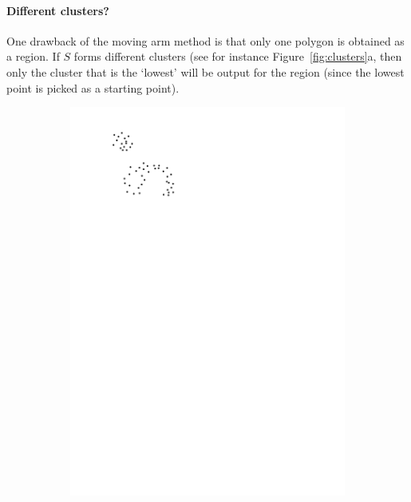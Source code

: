 \paragraph{Different clusters?} 
One drawback of the moving arm method is that only one polygon is obtained as a region.
If $S$ forms different clusters (see for instance Figure~\ref{fig:clusters}a, then only the cluster that is the `lowest' will be output for the region (since the lowest point is picked as a starting point).
\begin{figure}
  \centering
  \begin{subfigure}[b]{0.35\linewidth}
    \centering
    \includegraphics[page=1,width=\textwidth]{figs/clusters.pdf}
    \caption{}
    \label{fig:clusters:a}
  \end{subfigure}
  \qquad \qquad
  \begin{subfigure}[b]{0.35\linewidth}
    \centering

\end{subfigure}
\end{figure}
